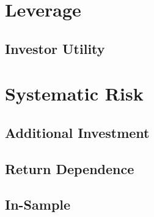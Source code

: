 \documentclass[11pt]{article}
\begin{document}


\section{Leverage} \label{sec:leverage}



\subsection{Investor Utility} \label{sec:invest_util}



\section{Systematic Risk}\label{sec:regression}


\subsection{Additional Investment} \label{sec:reinvestment}
%
%



\subsection{Return Dependence} \label{sec:market_cap}


\subsection{In-Sample} \label{sec:in_sample}



\end{document}
